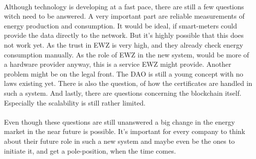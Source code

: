\documentclass{scrartcl}
\begin{document}
	\paragraph{}
	Although technology is developing at a fast pace, there are still a few questions witch need to be answered. A very important part are reliable measurements of energy production and consumption. It would be ideal, if smart-meters could provide the data directly to the network. But it's highly possible that this does not work yet. As the trust in EWZ is very high, and they already check energy consumption manually. As the role of EWZ in the new system, would be more of a hardware provider anyway, this is a service EWZ might provide. Another problem might be on the legal front. The DAO is still a young concept with no laws existing yet. There is also the question, of how the certificates are handled in such a system. And lastly, there are questions concerning the blockchain itself. Especially the scalability is still rather limited.
	
	\paragraph{}
	Even though these questions are still unanswered a big change in the energy market in the near future is possible. It's important for every company to think about their future role in such a new system and maybe even be the ones to initiate it, and get a pole-position, when the time comes. 
    
\end{document}
